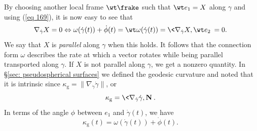 By choosing another local frame $\wt\frake$ such that $\wt e_1=X$ along $\gamma$ and using (\ref{eq 169}), it is now easy to see that 
\[\nabla_{\dot\gamma}X=0 \Leftrightarrow \omega(\dot\gamma(t))+\dot\phi(t)=\wt\omega(\dot\gamma(t))=\<\nabla_{\dot\gamma}X,\wt e_2\> =0.\]
We say that $X$ is \emph{parallel} along $\gamma$ when this holds. It follows that the connection form $\omega$ describes the rate at which a vector rotates while being parallel transported along $\gamma$. If $X$ is not parallel along $\gamma$, we get a nonzero quantity. In \S\ref{sec: pseudospherical surfaces} we defined the geodesic curvature and noted that it is intrinsic since $\kappa_{\mathrm{g}}=\lVert\nabla_{\dot\gamma}\dot\gamma\rVert$, or 
\[\kappa_{\mathrm{g}}=\<\nabla_{\dot\gamma}\dot\gamma,\bf{N}\>.\label{eq geodesic curvature}\]
In terms of the angle $\phi$ between $e_1$ and $\dot\gamma(t)$, we have 
\[\kappa_{\mathrm{g}}(t)=\omega(\dot\gamma(t))+\dot\phi(t).\]


